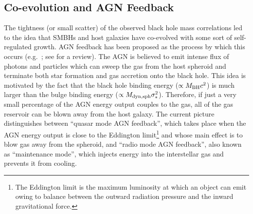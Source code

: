 \subsection{Co-evolution and AGN Feedback}
The tightness (or small scatter) of the observed black hole mass correlations led to the idea
that SMBHs and host galaxies have co-evolved with some sort of self-regulated growth.
AGN feedback has been proposed as the process by which this occurs
(e.g.~\citealt{silkrees1998,fabian1999,ostrikerciotti2005}; see \citealt{fabian2012} for a review). 
The AGN is believed to emit intense flux of photons and particles 
which can sweep the gas from the host spheroid 
and terminate both star formation and gas accretion onto the black hole. 
This idea is motivated by the fact that the black hole binding energy ($\propto M_{\rm BH} c^2$) 
is much larger than the bulge binding energy ($\propto M_{\rm dyn,sph} \sigma_*^2$). 
Therefore, if just a very small percentage of the AGN energy output couples to the gas, 
all of the gas reservoir can be blown away from the host galaxy. 
The current picture distinguishes between ``quasar mode AGN feedback'', 
which takes place when the AGN energy output is close to the Eddington limit\footnote{The Eddington 
limit is the maximum luminosity at which an object can emit 
owing to balance between the outward radiation pressure and the inward gravitational force. } 
and whose main effect is to blow gas away from the spheroid, 
and ``radio mode AGN feedback'', also known as ``maintenance mode'', 
which injects energy into the interstellar gas and prevents it from cooling. \\

